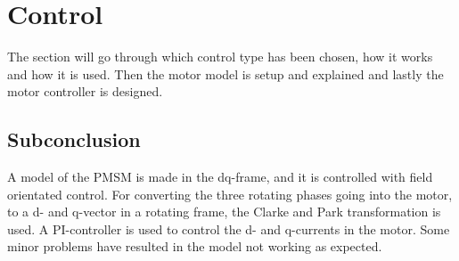 \section{Control}
\label{sec:control}

The section will go through which control type has been chosen, how it works and how it is used. Then the motor model is setup and explained and lastly the motor controller is designed.













\subsection*{Subconclusion}
A model of the PMSM is made in the dq-frame, and it is controlled with field orientated control. For converting the three rotating phases going into the motor, to a d- and q-vector in a rotating frame, the Clarke and Park transformation is used. A PI-controller is used to control the d- and q-currents in the motor. Some minor problems have resulted in the model not working as expected. 

